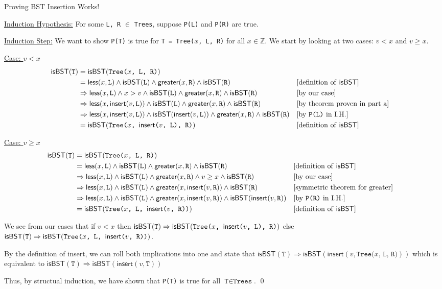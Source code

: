 \documentclass[11pt, nopagenumbers]{adamblan-hw}
\newcommand{\ZZ}{\mathbb{Z}}
\newcommand{\T}[1]{\texttt{#1}}
\newcommand{\finsert}{\textsf{insert}}
\newcommand{\fless}{\textsf{less}}
\newcommand{\fgreater}{\textsf{greater}}
\newcommand{\fisBST}{\textsf{isBST}}
\begin{document}
\begin{question}{\color{red} Proving BST Insertion Works!}
\begin{part}
\underline{Induction Hypothesis:} For some \T{L, R} $\in$ \T{Trees}, suppose \T{P(L)} and \T{P(R)} are true.

\underline{Induction Step:} We want to show \T{P(T)} is true for \T{T = Tree($x$, L, R)} for all $x \in \ZZ$. We start by looking at two cases: $v < x$ and $v \geq x$.

\underline{Case: $v < x$}  
\begin{align*}
\fisBST(\T{T}) &= \fisBST(\T{Tree($x$, L, R)})\\
&= \fless(x, \T{L}) \land \fisBST(\T{L}) \land \fgreater(x, \T{R}) \land \fisBST(\T{R}) && \text{[definition of \fisBST]} \\
&\Rightarrow \fless(x, \T{L}) \land x > v \land \fisBST(\T{L}) \land \fgreater(x, \T{R}) \land \fisBST(\T{R}) && \text{[by our case]} \\
&\Rightarrow \fless(x, \finsert(v, \T{L})) \land \fisBST(\T{L}) \land \fgreater(x, \T{R}) \land \fisBST(\T{R}) && \text{[by theorem proven in part a]} \\
&\Rightarrow \fless(x, \finsert(v, \T{L})) \land \fisBST(\finsert(v, \T{L})) \land \fgreater(x, \T{R}) \land \fisBST(\T{R}) && \text{[by \T{P(L)} in I.H.]} \\
&= \fisBST(\T{Tree($x$, \finsert($v$, \T{L}), R)}) && \text{[definition of \fisBST]}
\end{align*}

\underline{Case: $v \geq x$}  
\begin{align*}
\fisBST(\T{T}) &= \fisBST(\T{Tree($x$, L, R)})\\
&= \fless(x, \T{L}) \land \fisBST(\T{L}) \land \fgreater(x, \T{R}) \land \fisBST(\T{R}) && \text{[definition of \fisBST]} \\
&\Rightarrow \fless(x, \T{L}) \land \fisBST(\T{L}) \land \fgreater(x, \T{R}) \land v \geq x \land \fisBST(\T{R}) && \text{[by our case]} \\
&\Rightarrow \fless(x, \T{L}) \land \fisBST(\T{L}) \land \fgreater(x, \finsert(v, \T{R})) \land \fisBST(\T{R}) && \text{[symmetric theorem for greater]} \\
&\Rightarrow \fless(x, \T{L}) \land \fisBST(\T{L}) \land \fgreater(x, \finsert(v, \T{R})) \land \fisBST(\finsert(v, \T{R})) && \text{[by \T{P(R)} in I.H.]} \\
&= \fisBST(\T{Tree($x$, \T{L}, \finsert($v$, R))}) && \text{[definition of \fisBST]}
\end{align*}

We see from our cases that if $v < x$ then $\fisBST(\T{T}) \Rightarrow \fisBST(\T{Tree($x$, \finsert($v$, \T{L}), R)})$
else $\fisBST(\T{T}) \Rightarrow \fisBST(\T{Tree($x$, \T{L}, \finsert($v$, R))})$. 

By the definition of \finsert, we can roll both implications into one and state that 
$\fisBST(\T{T}) \Rightarrow \fisBST(\finsert(v, \T{Tree($x$, L, R)}))$ which is equivalent
to $\fisBST(\T{T}) \Rightarrow \fisBST(\finsert(v, \T{T}))$

Thus, by structual induction, we have shown that \T{P(T)} is true for all $\T{T} \in \T{Trees}$. \qed
\end{part}
\end{question}
\end{document}
